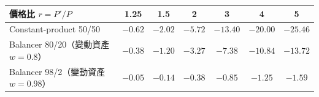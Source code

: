 \begin{tabular}{lcccccc}
\toprule
價格比 $r=P'/P$ & 1.25 & 1.5 & 2 & 3 & 4 & 5 \\
\midrule
Constant-product 50/50 & $-0.62$ & $-2.02$ & $-5.72$ & $-13.40$ & $-20.00$ & $-25.46$ \\
Balancer 80/20（變動資產 $w{=}0.8$） & $-0.38$ & $-1.20$ & $-3.27$ & $-7.38$ & $-10.84$ & $-13.72$ \\
Balancer 98/2（變動資產 $w{=}0.98$） & $-0.05$ & $-0.14$ & $-0.38$ & $-0.85$ & $-1.25$ & $-1.59$ \\
\bottomrule
\end{tabular}
